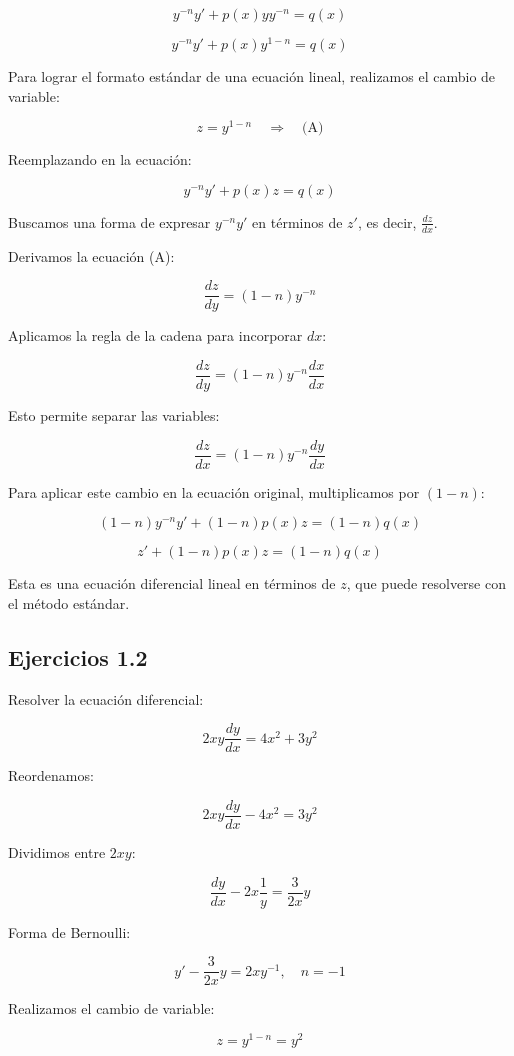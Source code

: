 \[
y^{-n} y' + p(x) y y^{-n} = q(x)
\]

\[
y^{-n} y' + p(x) y^{1-n} = q(x)
\]

Para lograr el formato estándar de una ecuación lineal, realizamos el cambio de variable:

\[
z = y^{1-n} \quad \Rightarrow \quad \text{(A)}
\]

Reemplazando en la ecuación:

\[
y^{-n} y' + p(x) z = q(x)
\]

Buscamos una forma de expresar \( y^{-n} y' \) en términos de \( z' \), es decir, \( \frac{dz}{dx} \).

Derivamos la ecuación (A):

\[
\frac{dz}{dy} = (1 - n) y^{-n}
\]

Aplicamos la regla de la cadena para incorporar \( dx \):

\[
\frac{dz}{dy} = (1 - n) y^{-n} \frac{dx}{dx}
\]

Esto permite separar las variables:

\[
\frac{dz}{dx} = (1 - n) y^{-n} \frac{dy}{dx}
\]

Para aplicar este cambio en la ecuación original, multiplicamos por \( (1 - n) \):

\[
(1 - n) y^{-n} y' + (1 - n) p(x) z = (1 - n) q(x)
\]

\[
z' + (1 - n) p(x) z = (1 - n) q(x)
\]

Esta es una ecuación diferencial lineal en términos de \( z \), que puede resolverse con el método estándar.



\subsection* {Ejercicios 1.2}


Resolver la ecuación diferencial:

\[
2xy \frac{dy}{dx} = 4x^2 + 3y^2
\]

Reordenamos:

\[
2xy \frac{dy}{dx} - 4x^2 = 3y^2
\]

Dividimos entre \( 2xy \):

\[
\frac{dy}{dx} - 2x \frac{1}{y} = \frac{3}{2x} y
\]

Forma de Bernoulli:

\[
y' - \frac{3}{2x} y = 2x y^{-1}, \quad n = -1
\]

Realizamos el cambio de variable:

\[
z = y^{1-n} = y^2
\]

